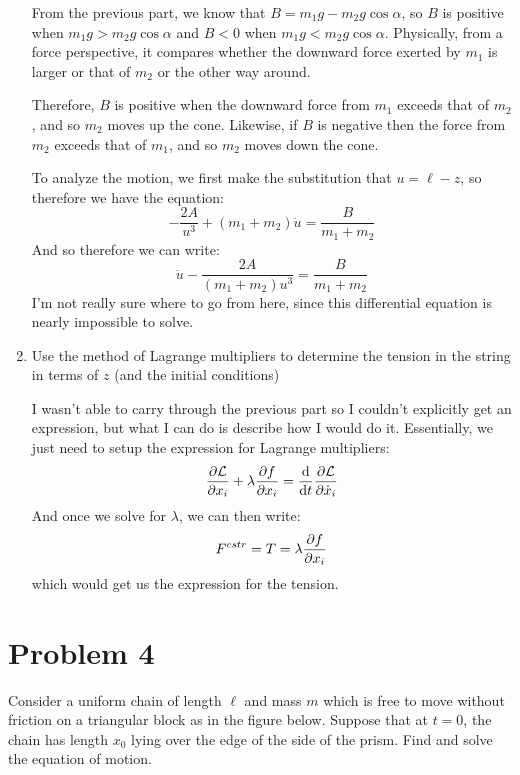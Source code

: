 \documentclass[10pt]{article}
\begin{document}
\begin{enumerate}[label=\alph*)]
					\begin{solution}
						From the previous part, we know that $B = m_1g - m_2g\cos \alpha$, so $B$ is positive
						when $m_1g > m_2g\cos \alpha$ and $B < 0$ when $m_1g < m_2g\cos \alpha$. Physically,
						from a force perspective, it compares whether the downward force exerted by 
						$m_1$ is larger or that of $m_2$ or the other way around.

						Therefore, $B$ is positive when the downward force from $m_1$ exceeds that of $m_2$, 
						and so $m_2$ moves up the cone. Likewise, if $B$ is negative then the force from 
						$m_2$ exceeds that of $m_1$, and so $m_2$ moves down the cone.

						To analyze the motion, we first make the substitution that $u = \ell - z$, so 
						therefore we have the equation: 
						\[ -\frac{2A}{u^3} +(m_1 +m_2)\ddot u = \frac{B}{m_1+m_2}\]
						And so therefore we can write:
						\[ \ddot u - \frac{2A}{(m_1 +m_2)u^3} = \frac{B}{m_1+m_2}\]
						I'm not really sure where to go from here, since this differential equation is nearly 
						impossible to solve.

					\end{solution}
			\item Use the method of Lagrange multipliers to determine the tension in the string in 
					terms of $z$ (and the initial conditions)

					\begin{solution}
						I wasn't able to carry through the previous part so I couldn't explicitly get an 
						expression, but what I can do is describe how I would do it. Essentially, we just need
						to setup the expression for Lagrange multipliers:
						\[ \pdv{\mathcal L}{x_{i}} + \lambda \pdv{f}{x_i} = \dv{t} \pdv{\mathcal L}{\dot x_{i}}\]
						And once we solve for $\lambda$, we can then write:
						\[ F^{cstr} = T  = \lambda \pdv{f}{x_i}\]
						which would get us the expression for the tension.
					\end{solution}
	\end{enumerate}

	\pagebreak

	\section*{Problem 4}
	
	Consider a uniform chain of length $\ell$ and mass $m$ which is free to move without friction on a
	triangular block as in the figure below. Suppose that at $t = 0$, the chain has length $x_0$ lying over
	the edge of the side of the prism. Find and solve the equation of motion.
\end{document}
